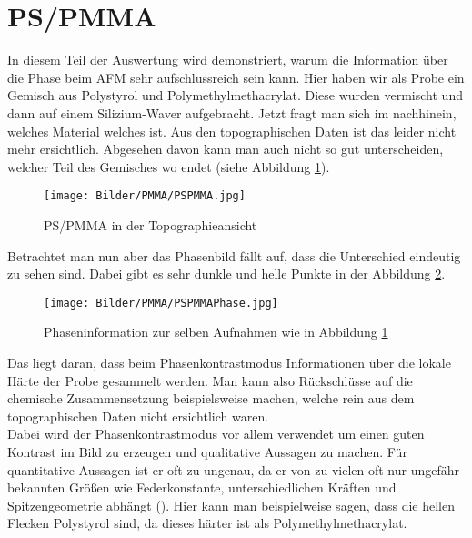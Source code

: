 \clearpage
\section{PS/PMMA}

In diesem Teil der Auswertung wird demonstriert, warum die Information über die Phase beim AFM sehr aufschlussreich sein kann. Hier haben wir 
als Probe ein Gemisch aus Polystyrol und Polymethylmethacrylat. Diese wurden vermischt und dann auf einem Silizium-Waver aufgebracht. 
Jetzt fragt man sich im nachhinein, welches Material welches ist. Aus den topographischen Daten ist das leider nicht mehr ersichtlich. Abgesehen davon kann man auch 
nicht so gut unterscheiden, welcher Teil des Gemisches wo endet (siehe Abbildung \ref{PMMA1}).\\
\begin{figure}[h]
    \centering
    \texttt{[image: Bilder/PMMA/PSPMMA.jpg]}
    \caption{PS/PMMA in der Topographieansicht}
    \label{PMMA1}
\end{figure}

Betrachtet man nun aber das Phasenbild fällt auf, dass die Unterschied eindeutig zu sehen sind. Dabei gibt es sehr dunkle und helle Punkte 
in der Abbildung \ref{PMMA2}.\\

\begin{figure}
    \centering
    \texttt{[image: Bilder/PMMA/PSPMMAPhase.jpg]}
    \caption{Phaseninformation zur selben Aufnahmen wie in Abbildung \ref{PMMA1}}
    \label{PMMA2}
\end{figure}

Das liegt daran, dass beim Phasenkontrastmodus Informationen über die lokale Härte der Probe gesammelt werden. Man kann also 
Rückschlüsse auf die chemische Zusammensetzung beispielsweise machen, welche rein aus dem topographischen Daten nicht ersichtlich waren.\\
Dabei wird der Phasenkontrastmodus vor allem verwendet um einen guten Kontrast im Bild zu erzeugen und qualitative Aussagen zu machen. 
Für quantitative Aussagen ist er oft zu ungenau, da er von zu vielen oft nur ungefähr bekannten Größen wie Federkonstante, unterschiedlichen Kräften und Spitzengeometrie 
abhängt (\cite[S.68]{SampleKit2007}).
Hier kann man beispielweise sagen, dass die hellen Flecken Polystyrol sind, da dieses härter ist als Polymethylmethacrylat\footnotemark.
